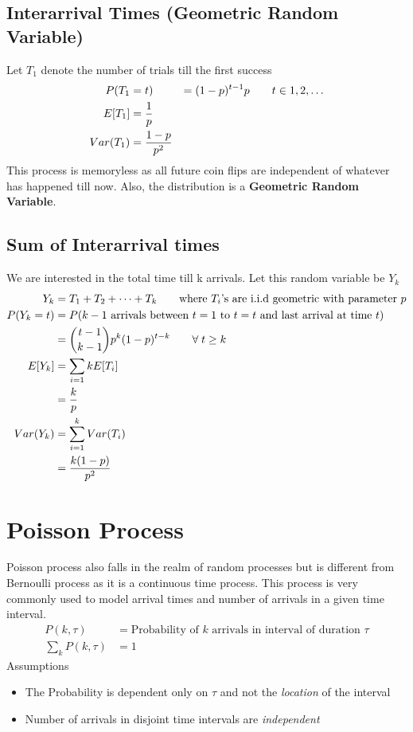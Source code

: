 \documentclass[11pt, a4paper]{article}
\begin{document}
    \subsection{Interarrival Times (Geometric Random Variable)}
    Let $T_{1}$ denote the number of trials till the first success
    \begin{align*}
        P(T_{1} &= t) &= (1-p)^{t-1}p \tag*{$t \in {1, 2, \ldots}$}\\
        E[T_{1}] &= \frac{1}{p}\\
        Var(T_{1}) &= \frac{1-p}{p^{2}}
    \end{align*}
    This process is memoryless as all future coin flips are independent of whatever has happened till now. Also, the distribution is a \textbf{Geometric Random Variable}.

    \subsection{Sum of Interarrival times}
    We are interested in the total time till k arrivals. Let this random variable be $Y_{k}$
    \begin{align*}
        Y_{k} &= T_{1} + T_{2} + \cdots + T_{k} \tag*{where $T_{i}$'s are i.i.d geometric with parameter $p$}\\
        P(Y_{k} = t) &= P(\text{$k-1$ arrivals between $t=1$ to $t=t$ and last arrival at time $t$})\\
           &= \binom{t-1}{k-1}p^{k}(1-p)^{t-k} \tag*{$\forall\; t \geq k$}\\
        E[Y_{k}] &= \sum_{i=1}{k}E[T_{i}]\\
                &= \frac{k}{p}\\
        Var(Y_{k}) &= \sum_{i=1}^{k}Var(T_{i})\\
                    &= \frac{k(1-p)}{p^{2}}
    \end{align*}


    \section{Poisson Process}
    Poisson process also falls in the realm of random processes but is different from Bernoulli process as it is a continuous time process. This process is very commonly used to model arrival times and number of arrivals in a given time interval.
    \begin{align*}
        P(k, \tau) &= \text{Probability of $k$ arrivals in interval of duration $\tau$}\\
        \sum_{k} P(k, \tau) &= 1 \tag*{for a given $\tau$}
    \end{align*}
    Assumptions
    \begin{itemize}
        \item The Probability is dependent only on $\tau$ and not the \emph{location} of the interval
        \item Number of arrivals in disjoint time intervals are \emph{independent}
    \end{itemize}
    
\end{document}
